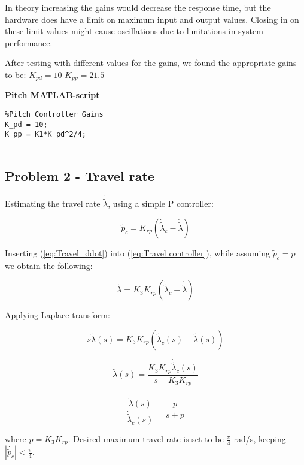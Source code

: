 In theory increasing the gains would decrease the response time, but the hardware does have a limit on maximum input and output values. Closing in on these limit-values might cause oscillations due to limitations in system performance.

After testing with different values for the gains, we found the appropriate gains to be:
$K_{pd}=10$
$K_{pp}=21.5$

\textbf{Pitch MATLAB-script}
\begin{lstlisting}
%Pitch Controller Gains
K_pd = 10;                
K_pp = K1*K_pd^2/4;      


\end{lstlisting}

\subsection{Problem 2 - Travel rate}
Estimating the travel rate $\dot{\widetilde{\lambda}}$, using a simple P controller:

\begin{equation}\label{eq:Travel controller}
    {\tilde p_c} = {K_{rp}}({\dot{\tilde\lambda}_c} - \dot{\tilde \lambda} )
\end{equation}

Inserting (\ref{eq:Travel_ddot}) into (\ref{eq:Travel controller}), while assuming $\widetilde{p}_c = p$ we obtain the following:

\begin{equation}
    \ddot{\tilde{\lambda}}  = {K_3}{K_{rp}}({{\dot {\tilde \lambda} }_c} - \dot{\tilde \lambda} )
\end{equation}

Applying Laplace transform:

\begin{equation}
    s\dot{\tilde \lambda}(s) = {K_3}{K_{rp}}({{\dot{\tilde \lambda}}_c}(s) - \dot{\tilde \lambda} (s))
\end{equation}

\begin{equation}
    \dot {\tilde \lambda} (s) = \frac{{{K_3}{K_{rp}}{{\dot {\tilde \lambda} }_c}(s)}}{{s + {K_3}{K_{rp}}}}
\end{equation}

\begin{equation}
    \frac{{\dot {\tilde \lambda}(s) }}{{{{\dot {\tilde \lambda}_c(s) }}}} = \frac{p}{{s + p}}
\end{equation}

where $p = K_3K_{rp}$. Desired maximum travel rate is set to be $\frac{\pi}{4}$ rad/s, keeping $\left| {\dot{\widetilde{p}_c}} \right| < {\frac{\pi }{4}}$.


